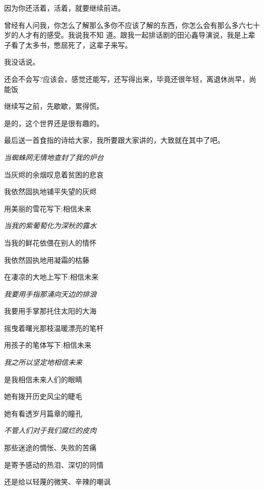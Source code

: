 \documentclass[11pt,a4paper,onecolumn]{article}
\begin{document}
因为你还活着，活着，就要继续前进。

曾经有人问我，你怎么了解那么多你不应该了解的东西，你怎么会有那么多六七十岁的人才有的感受。我说我不知
道。跟我一起排话剧的田沁鑫导演说，我是上辈子看了太多书，憋屈死了，这辈子来写。

我没话说。

还会不会写?应该会，感觉还能写，还写得出来，毕竟还很年轻，离退休尚早，尚能饭

继续写之前，先歇歇，累得慌。

是的，这个世界还是很有趣的。

最后送一首食指的诗给大家，我所要跟大家讲的，大致就在其中了吧。

\newenvironment{wuxchpoem}
{\begin{center}
\begin{minipage}[t]{0.5\textwidth}\itshape }
{\end{minipage}
\end{center}}

\begin{wuxchpoem}
当蜘蛛网无情地查封了我的炉台

当灰烬的余烟叹息着贫困的悲哀

我依然固执地铺平失望的灰烬

用美丽的雪花写下:相信未来
\end{wuxchpoem}


\begin{wuxchpoem}
当我的紫葡萄化为深秋的露水

当我的鲜花依偎在别人的情怀

我依然固执地用凝霜的枯藤

在凄凉的大地上写下:相信未来
\end{wuxchpoem}

\begin{wuxchpoem}
我要用手指那涌向天边的排浪

我要用手掌那托住太阳的大海

摇曳着曙光那枝温暖漂亮的笔杆

用孩子的笔体写下:相信未来
\end{wuxchpoem}

\begin{wuxchpoem}
我之所以坚定地相信未来

是我相信未来人们的眼睛

她有拨开历史风尘的睫毛

她有看透岁月篇章的瞳孔
\end{wuxchpoem}

\begin{wuxchpoem}
不管人们对于我们腐烂的皮肉

那些迷途的惆怅、失败的苦痛

是寄予感动的热泪、深切的同情

还是给以轻蔑的微笑、辛辣的嘲讽
\end{wuxchpoem}
\end{document}
